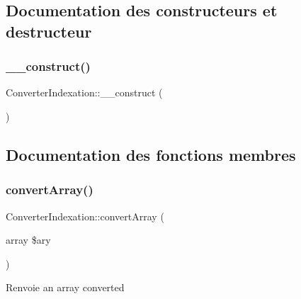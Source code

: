\subsection{Documentation des constructeurs et destructeur}
\hypertarget{class_converter_indexation_affb2c0b377c55d112b89150204d9e85f}{}\label{class_converter_indexation_affb2c0b377c55d112b89150204d9e85f} 
\subsubsection{\texorpdfstring{\+\_\+\+\_\+construct()}{\_\_construct()}}
{\footnotesize\ttfamily Converter\+Indexation\+::\+\_\+\+\_\+construct (\begin{DoxyParamCaption}{ }\end{DoxyParamCaption})}



\subsection{Documentation des fonctions membres}
\hypertarget{class_converter_indexation_a171eb2b7d4d6452218212da881972dfd}{}\label{class_converter_indexation_a171eb2b7d4d6452218212da881972dfd} 
\subsubsection{\texorpdfstring{convert\+Array()}{convertArray()}}
{\footnotesize\ttfamily Converter\+Indexation\+::convert\+Array (\begin{DoxyParamCaption}\item[{array}]{\$ary }\end{DoxyParamCaption})}

\begin{DoxyReturn}{Renvoie}
an array converted 
\end{DoxyReturn}
\hypertarget{class_converter_indexation_a3d6b48ec5eaf46b9a2a8b3bdc200e063}{}\label{class_converter_indexation_a3d6b48ec5eaf46b9a2a8b3bdc200e063} 
